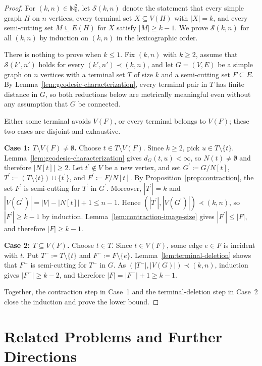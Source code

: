 \documentclass[11pt,a4paper]{amsart}
\theoremstyle{definition}
\theoremstyle{plain}
\newcommand{\dist}[3]{d_{#1}(#2,#3)}
\begin{document}
\begin{proof}
For $(k,n)\in \mathbb{N}_0^2$, let $\mathcal{S}(k,n)$ denote the statement that every simple graph $H$ on $n$ vertices, every terminal set $X\subseteq V(H)$ with $|X|=k$, and every semi-cutting set $M\subseteq E(H)$ for $X$ satisfy $|M|\ge k-1$. We prove $\mathcal{S}(k,n)$ for all $(k,n)$ by induction on $(k,n)$ in the lexicographic order.

There is nothing to prove when $k\le 1$. Fix $(k,n)$ with $k\ge 2$, assume that $\mathcal{S}(k',n')$ holds for every $(k',n')\prec (k,n)$, and let $G=(V,E)$ be a simple graph on $n$ vertices with a terminal set $T$ of size $k$ and a semi-cutting set $F\subseteq E$. By Lemma~\ref{lem:geodesic-characterization}, every terminal pair in $T$ has finite distance in $G$, so both reductions below are metrically meaningful even without any assumption that $G$ be connected.

Either some terminal avoids $V(F)$, or every terminal belongs to $V(F)$; these two cases are disjoint and exhaustive.

\smallskip\noindent
\textbf{Case 1: $T\setminus V(F)\neq\emptyset$.}
Choose $t\in T\setminus V(F)$. Since $k\ge 2$, pick $u\in T\setminus\{t\}$. Lemma~\ref{lem:geodesic-characterization} gives $\dist{G}{t}{u}<\infty$, so $N(t)\neq\emptyset$ and therefore $|N[t]|\ge 2$. Let $t^\prime\notin V$ be a new vertex, and set $G^\prime\coloneqq G/N[t]$, $T^\prime\coloneqq (T\setminus\{t\})\cup\{t^\prime\}$, and $F^\prime\coloneqq F/N[t]$. By Proposition~\ref{prop:contraction}, the set $F^\prime$ is semi-cutting for $T^\prime$ in $G^\prime$. Moreover, $|T^\prime|=k$ and $|V(G^\prime)|=|V|-|N[t]|+1\le n-1$.
Hence $(|T^\prime|,|V(G^\prime)|)\prec (k,n)$, so $|F^\prime|\ge k-1$ by induction. Lemma~\ref{lem:contraction-image-size} gives $|F^\prime|\le |F|$, and therefore $|F|\ge k-1$.

\smallskip\noindent
\textbf{Case 2: $T\subseteq V(F)$.}
Choose $t\in T$. Since $t\in V(F)$, some edge $e\in F$ is incident with $t$. Put $T^-\coloneqq T\setminus\{t\}$ and $F^-\coloneqq F\setminus\{e\}$. Lemma~\ref{lem:terminal-deletion} shows that $F^-$ is semi-cutting for $T^-$ in $G$. As $(|T^-|,|V(G)|)\prec (k,n)$, induction gives $|F^-|\ge k-2$, and therefore $|F|=|F^-|+1\ge k-1$.

Together, the contraction step in Case~1 and the terminal-deletion step in Case~2 close the induction and prove the lower bound.
\end{proof}

\section{Related Problems and Further Directions}\label{sec:related}
\end{document}
